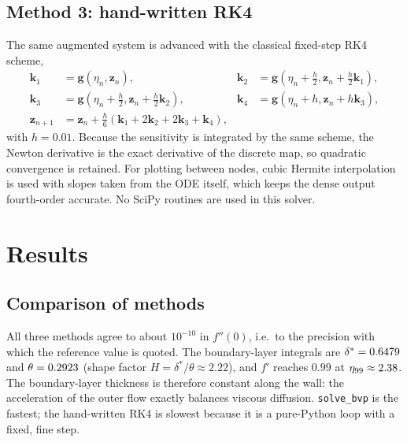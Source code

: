 \documentclass[11pt,a4paper]{article}
\begin{document}
\subsection{Method 3: hand-written RK4}
The same augmented system is advanced with the classical fixed-step RK4 scheme,
\begin{align*}
\mathbf{k}_1 &= \mathbf{g}(\eta_n,\mathbf{z}_n), &
\mathbf{k}_2 &= \mathbf{g}(\eta_n+\tfrac h2,\mathbf{z}_n+\tfrac h2\mathbf{k}_1),\\
\mathbf{k}_3 &= \mathbf{g}(\eta_n+\tfrac h2,\mathbf{z}_n+\tfrac h2\mathbf{k}_2), &
\mathbf{k}_4 &= \mathbf{g}(\eta_n+h,\mathbf{z}_n+h\mathbf{k}_3),\\
\mathbf{z}_{n+1} &= \mathbf{z}_n + \tfrac h6(\mathbf{k}_1+2\mathbf{k}_2+2\mathbf{k}_3+\mathbf{k}_4),
\end{align*}
with $h = 0.01$. Because the sensitivity is integrated by the same scheme, the Newton derivative is the
exact derivative of the discrete map, so quadratic convergence is retained. For plotting between nodes,
cubic Hermite interpolation is used with slopes taken from the ODE itself, which keeps the dense
output fourth-order accurate. No SciPy routines are used in this solver.

\section{Results}

\subsection{Comparison of methods}
\begin{table}[H]
\centering
\caption{Results at $\eta_\infty = 10$. Error is relative to the literature value $f''(0)=1.232587657$.
$\delta^* = \int_0^\infty (1-f')\,d\eta$ and $\theta = \int_0^\infty f'(1-f')\,d\eta$ are the
displacement and momentum thicknesses. Iteration counts for shooting are summed over all continuation stages.}
\label{tab:comp}
\small

\end{table}

All three methods agree to about $10^{-10}$ in $f''(0)$, i.e.\ to the precision with which the
reference value is quoted. The boundary-layer integrals are $\delta^* = 0.6479$ and
$\theta = 0.2923$ (shape factor $H = \delta^*/\theta \approx 2.22$), and $f'$ reaches
$0.99$ at $\eta_{99} \approx 2.38$. The boundary-layer thickness is therefore constant
along the wall: the acceleration of the outer flow exactly balances viscous diffusion.
\texttt{solve\_bvp} is the fastest; the hand-written RK4 is slowest because it is a pure-Python loop with
a fixed, fine step.
\end{document}
